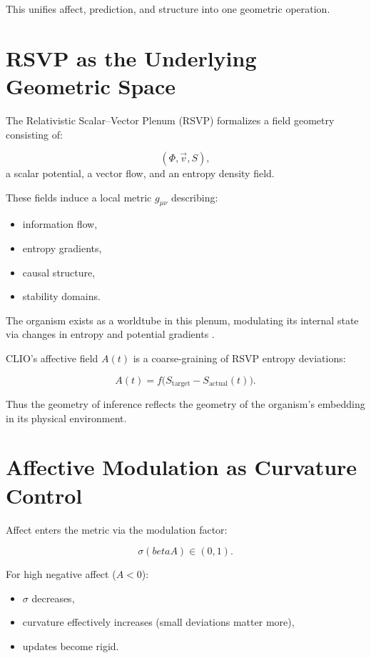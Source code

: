 \documentclass[12pt,oneside]{book}
\theoremstyle{plain}
\theoremstyle{definition}
\let\citep\parencite
\def\beta{beta}%
\begin{document}
This unifies affect, prediction, and structure into one geometric operation.

\section{RSVP as the Underlying Geometric Space}

The Relativistic Scalar–Vector Plenum (RSVP) formalizes a field geometry
consisting of:

\[
(\Phi, \vec{v}, S),
\]
a scalar potential, a vector flow, and an entropy density field.

These fields induce a local metric $g_{\mu\nu}$ describing:

\begin{itemize}
    \item information flow,
    \item entropy gradients,
    \item causal structure,
    \item stability domains.
\end{itemize}

The organism exists as a worldtube in this plenum, modulating its internal state
via changes in entropy and potential gradients \citep{jacobson1995thermo,
verlinde2011entropic}.

CLIO’s affective field $A(t)$ is a coarse-graining of RSVP entropy deviations:

\[
A(t) = f\big( S_{\text{target}} - S_{\text{actual}}(t) \big).
\]

Thus the geometry of inference reflects the geometry of the organism’s
embedding in its physical environment.

\section{Affective Modulation as Curvature Control}

Affect enters the metric via the modulation factor:

\[
\sigma(\beta A) \in (0,1).
\]

For high negative affect ($A < 0$):

\begin{itemize}
    \item $\sigma$ decreases,
    \item curvature effectively increases
          (small deviations matter more),
    \item updates become rigid.
\end{itemize}
\end{document}

